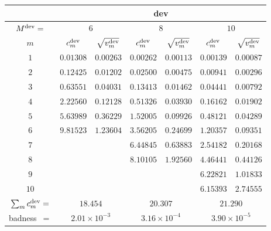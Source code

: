 \begin{tabular}{c|cc|cc|cc|}
&
\multicolumn{6}{|c|}{dev} \\
\hline
$M^{\mathrm{dev}}=$ &
 \multicolumn{2}{|c|}{$6$} &
 \multicolumn{2}{|c|}{$8$} &
 \multicolumn{2}{|c|}{$10$} \\
$m$ &
 $c^{\mathrm{dev}}_m$ & $\sqrt{v^{\mathrm{dev}}_m}$ &
 $c^{\mathrm{dev}}_m$ & $\sqrt{v^{\mathrm{dev}}_m}$ &
 $c^{\mathrm{dev}}_m$ & $\sqrt{v^{\mathrm{dev}}_m}$ \\
$1$ &
 $0.01308$ & $0.00263$ &
 $0.00262$ & $0.00113$ &
 $0.00139$ & $0.00087$ \\
$2$ &
 $0.12425$ & $0.01202$ &
 $0.02500$ & $0.00475$ &
 $0.00941$ & $0.00296$ \\
$3$ &
 $0.63551$ & $0.04031$ &
 $0.13413$ & $0.01462$ &
 $0.04441$ & $0.00792$ \\
$4$ &
 $2.22560$ & $0.12128$ &
 $0.51326$ & $0.03930$ &
 $0.16162$ & $0.01902$ \\
$5$ &
 $5.63989$ & $0.36229$ &
 $1.52005$ & $0.09926$ &
 $0.48121$ & $0.04289$ \\
$6$ &
 $9.81523$ & $1.23604$ &
 $3.56205$ & $0.24699$ &
 $1.20357$ & $0.09351$ \\
$7$ &
 $~$ & $~$ &
 $6.44845$ & $0.63883$ &
 $2.54182$ & $0.20168$ \\
$8$ &
 $~$ & $~$ &
 $8.10105$ & $1.92560$ &
 $4.46441$ & $0.44126$ \\
$9$ &
 $~$ & $~$ &
 $~$ & $~$ &
 $6.22821$ & $1.01833$ \\
$10$ &
 $~$ & $~$ &
 $~$ & $~$ &
 $6.15393$ & $2.74555$ \\
\hline
$\sum_m c^{\mathrm{dev}}_m=$ &
 \multicolumn{2}{|c|}{$18.454$} &
 \multicolumn{2}{|c|}{$20.307$} &
 \multicolumn{2}{|c|}{$21.290$} \\
badness~$=$ &
 \multicolumn{2}{|c|}{$2.01\times 10^{-3}$} &
 \multicolumn{2}{|c|}{$3.16\times 10^{-4}$} &
 \multicolumn{2}{|c|}{$3.90\times 10^{-5}$} \\
\end{tabular}
